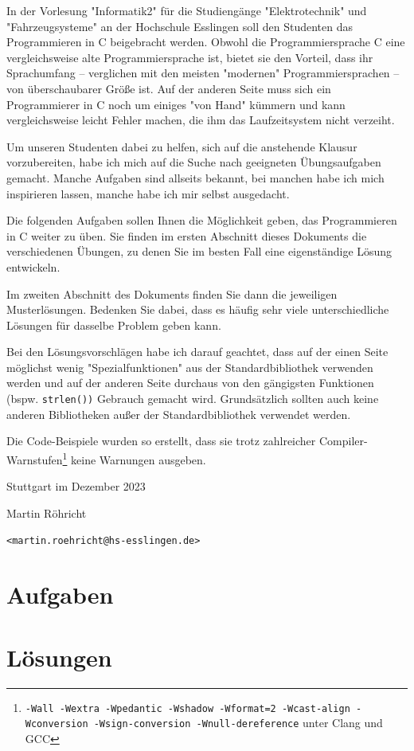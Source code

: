 \documentclass{coding-exercises}
\begin{document}
In der Vorlesung "Informatik2" für die Studiengänge "Elektrotechnik" und
"Fahrzeugsysteme" an der Hochschule Esslingen soll den Studenten das
Programmieren in C beigebracht werden. Obwohl die Programmiersprache C eine
vergleichsweise alte Programmiersprache ist, bietet sie den Vorteil, dass ihr
Sprachumfang -- verglichen mit den meisten "modernen" Programmiersprachen --
von überschaubarer Größe ist. Auf der anderen Seite muss sich ein Programmierer
in C noch um einiges "von Hand" kümmern und kann vergleichsweise leicht Fehler
machen, die ihm das Laufzeitsystem nicht verzeiht.

Um unseren Studenten dabei zu helfen, sich auf die anstehende Klausur
vorzubereiten, habe ich mich auf die Suche nach geeigneten Übungsaufgaben
gemacht. Manche Aufgaben sind allseits bekannt, bei manchen habe ich mich
inspirieren lassen, manche habe ich mir selbst ausgedacht.

Die folgenden Aufgaben sollen Ihnen die Möglichkeit geben, das Programmieren in
C weiter zu üben. Sie finden im ersten Abschnitt dieses Dokuments die
verschiedenen Übungen, zu denen Sie im besten Fall eine eigenständige Lösung
entwickeln.

Im zweiten Abschnitt des Dokuments finden Sie dann die jeweiligen
Musterlösungen. Bedenken Sie dabei, dass es häufig sehr viele unterschiedliche
Lösungen für dasselbe Problem geben kann.

Bei den Lösungsvorschlägen habe ich darauf geachtet, dass auf der einen Seite
möglichst wenig "Spezialfunktionen" aus der Standardbibliothek verwenden werden
und auf der anderen Seite durchaus von den gängigsten Funktionen (bspw.
\texttt{strlen())} Gebrauch gemacht wird. Grundsätzlich sollten auch
keine anderen Bibliotheken außer der Standardbibliothek verwendet werden.

Die Code-Beispiele wurden so erstellt, dass sie trotz zahlreicher
Compiler-Warnstufen\footnote{\texttt{-Wall -Wextra -Wpedantic -Wshadow
-Wformat=2 -Wcast-align -Wconversion -Wsign-conversion -Wnull-dereference} unter
Clang und GCC} keine Warnungen ausgeben.

\begin{flushright}
    Stuttgart im Dezember 2023\par
    Martin Röhricht\par
    \texttt{<martin.roehricht@hs-esslingen.de>}
\end{flushright}

\tableofcontents

\mainmatter
\part{Aufgaben}



\setcounter{chapter}{0} %
\part{Lösungen}




\backmatter
\end{document}
